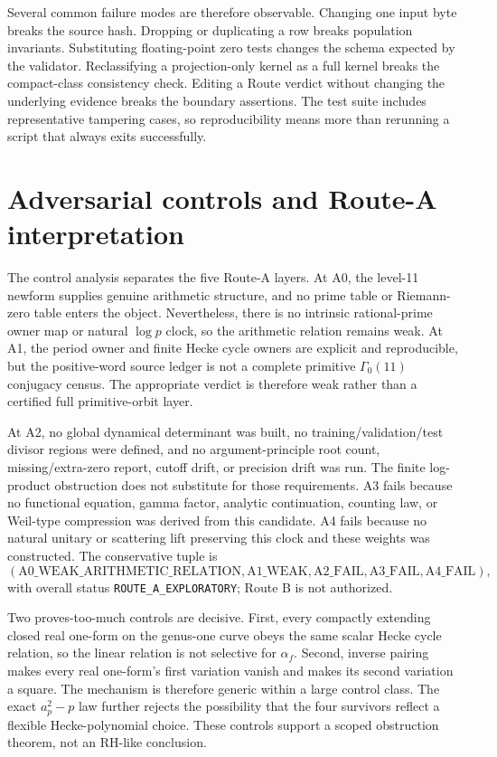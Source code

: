 \documentclass[11pt]{article}
\theoremstyle{definition}
\theoremstyle{remark}
\newcommand{\G}{\Gamma_0(11)}
\begin{document}
Several common failure modes are therefore observable. Changing one input byte breaks the source hash. Dropping or duplicating a row breaks population invariants. Substituting floating-point zero tests changes the schema expected by the validator. Reclassifying a projection-only kernel as a full kernel breaks the compact-class consistency check. Editing a Route verdict without changing the underlying evidence breaks the boundary assertions. The test suite includes representative tampering cases, so reproducibility means more than rerunning a script that always exits successfully.

\section{Adversarial controls and Route-A interpretation}

The control analysis separates the five Route-A layers. At A0, the level-11 newform supplies genuine arithmetic structure, and no prime table or Riemann-zero table enters the object. Nevertheless, there is no intrinsic rational-prime owner map or natural $\log p$ clock, so the arithmetic relation remains weak. At A1, the period owner and finite Hecke cycle owners are explicit and reproducible, but the positive-word source ledger is not a complete primitive $\G$ conjugacy census. The appropriate verdict is therefore weak rather than a certified full primitive-orbit layer.

At A2, no global dynamical determinant was built, no training/validation/test divisor regions were defined, and no argument-principle root count, missing/extra-zero report, cutoff drift, or precision drift was run. The finite log-product obstruction does not substitute for those requirements. A3 fails because no functional equation, gamma factor, analytic continuation, counting law, or Weil-type compression was derived from this candidate. A4 fails because no natural unitary or scattering lift preserving this clock and these weights was constructed. The conservative tuple is
\[
(\mathrm{A0\_WEAK\_ARITHMETIC\_RELATION},
\mathrm{A1\_WEAK},\mathrm{A2\_FAIL},\mathrm{A3\_FAIL},\mathrm{A4\_FAIL}),
\]
with overall status \texttt{ROUTE\_A\_EXPLORATORY}; Route B is not authorized.

Two proves-too-much controls are decisive. First, every compactly extending closed real one-form on the genus-one curve obeys the same scalar Hecke cycle relation, so the linear relation is not selective for $\alpha_f$. Second, inverse pairing makes every real one-form's first variation vanish and makes its second variation a square. The mechanism is therefore generic within a large control class. The exact $a_p^2-p$ law further rejects the possibility that the four survivors reflect a flexible Hecke-polynomial choice. These controls support a scoped obstruction theorem, not an RH-like conclusion.
\end{document}
